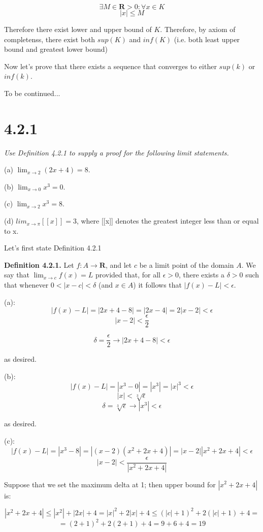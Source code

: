 \documentclass[11pt,oneside,titlepage]{article}
\begin{document}
$$ \exists M \in \textbf{R} > 0 :  \forall x \in K $$
$$ |x| \leq M $$


Therefore there exist lower and upper bound of $K$. Therefore, by axiom of completenss, there exist
both $sup(K)$ and $inf(K)$ (i.e. both least upper bound and greatest lower bound)

Now let's prove that there exists a sequence that converges to either $sup(k)$ or $inf(k)$.

To be continued...


\section*{4.2.1}
\textit{Use Definition 4.2.1 to supply a proof for the following limit statements.}

(a) $\lim_{x \to 2}(2x + 4) = 8$.

(b) $\lim_{x\to0} x^3 = 0$.

(c) $\lim_{x\to2} x^3 = 8$.

(d) $lim_{x\to\pi}[[x]] = 3$, where [[x]] denotes the greatest integer less than or
equal to x.

Let's first state Definition 4.2.1

\textbf{Definition 4.2.1.} Let $f : A \to \textbf{R}$, and let $c$ be a limit point of the domain $A$. We say that $\lim_{x\to c} f(x) = L$ provided that, for all $\epsilon > 0$, there exists
a $\delta > 0$ such that whenever $0 < |x - c| < \delta$ (and $x \in A$) it follows that $|f(x) - L| < \epsilon$.

(a):
$$ |f(x) - L| = |2 x + 4 - 8| = |2 x - 4| = 2|x - 2| < \epsilon $$
$$ |x-2| < \frac{\epsilon}{2}$$

$$  \delta = \frac{\epsilon}{2} \to |2 x + 4 - 8| < \epsilon $$

as desired.

(b):
$$ |f(x) - L| = |x^3 - 0| = |x^3| = |x|^3 < \epsilon $$
$$ |x| < \sqrt[3]{\epsilon}{} $$
$$ \delta = \sqrt[3]{\epsilon} \to |x^3| < \epsilon $$

as desired.

(c):
$$ |f(x) - L| = |x^3 - 8| = |(x - 2)(x^2 + 2x + 4)| = |x-2||x^2 + 2x + 4| < \epsilon $$
$$|x-2| < \frac{\epsilon}{|x^2 + 2x + 4|} $$

Suppose that we set the maximum delta at 1; then upper bound for $|x^2 + 2x + 4|$ is:

$$ |x^2 + 2x + 4| \leq |x^2| + |2x| + 4 = |x|^2 + 2|x| + 4 \leq (|c| + 1)^2 + 2(|c| + 1) + 4 =$$
$$= (2 + 1)^2 + 2(2 + 1) + 4 = 9 + 6 + 4 = 19
$$
\end{document}
